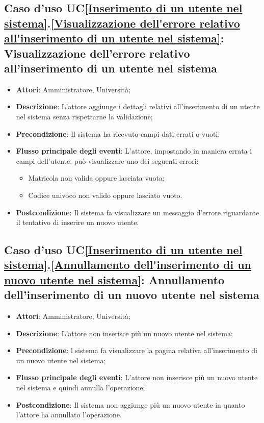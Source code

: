 \subsection{Caso d'uso UC\ref{Inserimento di un utente nel sistema}.\ref{Visualizzazione dell'errore relativo all'inserimento di un utente nel sistema}: Visualizzazione dell'errore relativo all'inserimento di un utente nel sistema}
\begin{itemize}
	\item \textbf{Attori}: Amministratore, Università;
	\item \textbf{Descrizione}: L'attore aggiunge i dettagli relativi all'inserimento di un utente nel sistema senza rispettarne la validazione;
	\item \textbf{Precondizione}: Il sistema ha ricevuto campi dati errati o vuoti;
	
	
	\item \textbf{Flusso principale degli eventi}: L'attore, impostando in maniera errata i campi dell'utente, può visualizzare uno dei seguenti errori:
	\begin{itemize}
		\item Matricola non valida oppure lasciata vuota;
		\item Codice univoco non valido oppure lasciato vuoto.
	\end{itemize}
	\item \textbf{Postcondizione}: Il sistema fa visualizzare un messaggio d'errore riguardante il tentativo di inserire un nuovo utente.
	
\end{itemize}

\subsection{Caso d'uso UC\ref{Inserimento di un utente nel sistema}.\ref{Annullamento dell'inserimento di un nuovo utente nel sistema}: Annullamento dell'inserimento di un nuovo utente nel sistema}
\begin{itemize}
	\item \textbf{Attori}: Amministratore, Università;
	\item \textbf{Descrizione}: L'attore non inserisce più un nuovo utente nel sistema;
	\item \textbf{Precondizione}: l sistema fa visualizzare la pagina relativa all'inserimento di un nuovo utente nel sistema;
	
	\item \textbf{Flusso principale degli eventi}: L'attore non inserisce più un nuovo utente nel sistema e quindi annulla l'operazione;
	\item \textbf{Postcondizione}: Il sistema non aggiunge più un nuovo utente in quanto l'attore ha annullato l'operazione.
	
\end{itemize}

